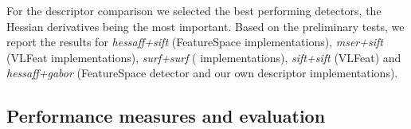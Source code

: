 \documentclass[preprint,authoryear,review]{elsarticle}
\begin{document}
For the descriptor comparison we selected the best performing detectors, the
Hessian derivatives being the most important. Based on the preliminary tests, we
report the results for \textit{hessaff+sift} (FeatureSpace implementations),
\textit{mser+sift} (VLFeat implementations), \textit{surf+surf}
(\cite{BayEssTuy:2008} implementations), \textit{sift+sift}
(VLFeat) and \textit{hessaff+gabor} (FeatureSpace detector and our own
descriptor implementations).

\subsection{Performance measures and evaluation\label{sec:descrperformance}}
\end{document}
